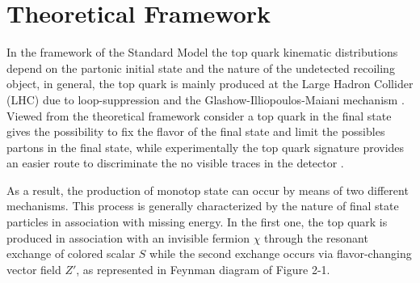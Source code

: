 \section{Theoretical Framework}
\label{sec:theory_framework}

In the framework of the Standard Model the top quark kinematic distributions depend on the partonic initial state and the nature of the undetected recoiling object, in general, the top quark is mainly produced at the Large Hadron Collider (LHC) due to loop-suppression and the Glashow-Illiopoulos-Maiani mechanism \cite{320}. Viewed from the theoretical framework consider a top quark in the final state gives the possibility to fix the flavor of the final state and limit the possibles partons in the final state, while experimentally the top quark signature provides an easier route to discriminate the no visible traces in the detector \cite{319}. 

As a result, the production of monotop state can occur by means of two different mechanisms. This process is generally characterized by the nature of final state particles in association with missing energy. In the first one, the top quark is produced in association with an invisible fermion $\chi$ through the resonant exchange of colored scalar $S$ while the second exchange occurs via flavor-changing vector field $Z'$, as represented in Feynman diagram of Figure 2-1.

